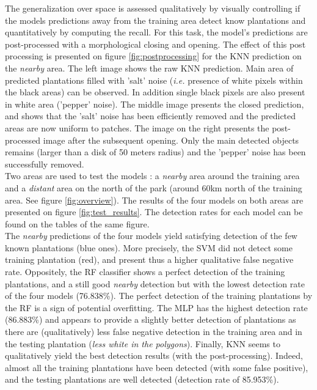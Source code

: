 \documentclass[a4paper, 12pt]{article}
\begin{document}
            The generalization over space is assessed qualitatively by visually controlling if the models predictions away from the training area detect know plantations and quantitatively by computing the recall. For this task, the model's predictions are post-processed with a morphological closing and opening. The effect of this post processing is presented on figure \ref{fig:postprocessing} for the KNN prediction on the \textit{nearby} area. The left image shows the raw KNN prediction. Main area of predicted plantations filled with 'salt' noise (\textit{i.e.} presence of white pixels within the black areas) can be observed. In addition single black pixels are also present in white area ('pepper' noise). The middle image presents the closed prediction, and shows that the 'salt' noise has been efficiently removed and the predicted areas are now uniform to patches. The image on the right presents the post-processed image after the subsequent opening. Only the main detected objects remains (larger than a disk of 50 meters radius) and the 'pepper' noise has been successfully removed.
            \\
            Two areas are used to test the models : a \textit{nearby} area around the training area and a \textit{distant} area on the north of the park (around 60km north of the training area. See figure \ref{fig:overview}). The results of the four models on both areas are presented on figure \ref{fig:test_results}. The detection rates for each model can be found on the tables of the same figure.
            \\
            The \textit{nearby} predictions of the four models yield satisfying detection of the few known plantations (blue ones). More precisely, the SVM did not detect some training plantation (red), and present thus a higher qualitative false negative rate. Oppositely, the RF classifier shows a perfect detection of the training plantations, and a still good \textit{nearby} detection but with the lowest detection rate of the four models (76.838\%). The perfect detection of the training plantations by the RF is a sign of potential overfitting. The MLP has the highest detection rate (86.883\%) and appears to provide a slightly better detection of plantations as there are (qualitatively) less false negative detection in the training area and in the testing plantation (\textit{less white in the polygons}). Finally, KNN seems to qualitatively yield the best detection results (with the post-processing). Indeed, almost all the training plantations have been detected (with some false positive), and the testing plantations are well detected (detection rate of 85.953\%).
\end{document}
